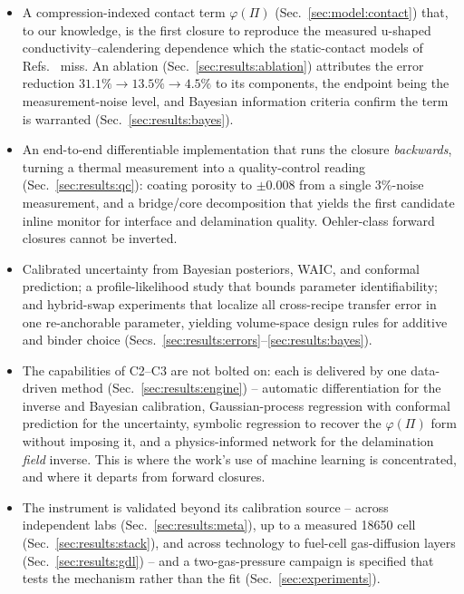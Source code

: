 \documentclass[10pt,a4paper]{article}
\begin{document}
\begin{itemize}
\item[\textbf{C1 -- process resolution.}] A compression-indexed contact term $\varphi(\Pi)$ (Sec.~\ref{sec:model:contact}) that, to our knowledge, is the first closure to reproduce the measured u-shaped conductivity--calendering dependence which the static-contact models of Refs.~\cite{oehler2021,sangros2017} miss. An ablation (Sec.~\ref{sec:results:ablation}) attributes the error reduction $31.1\%\to13.5\%\to4.5\%$ to its components, the endpoint being the measurement-noise level, and Bayesian information criteria confirm the term is warranted (Sec.~\ref{sec:results:bayes}).
\item[\textbf{C2 -- invertibility.}] An end-to-end differentiable implementation that runs the closure \emph{backwards}, turning a thermal measurement into a quality-control reading (Sec.~\ref{sec:results:qc}): coating porosity to $\pm0.008$ from a single $3\%$-noise measurement, and a bridge/core decomposition that yields the first candidate inline monitor for interface and delamination quality. Oehler-class forward closures cannot be inverted.
\item[\textbf{C3 -- uncertainty and transfer.}] Calibrated uncertainty from Bayesian posteriors, WAIC, and conformal prediction; a profile-likelihood study that bounds parameter identifiability; and hybrid-swap experiments that localize all cross-recipe transfer error in one re-anchorable parameter, yielding volume-space design rules for additive and binder choice (Secs.~\ref{sec:results:errors}--\ref{sec:results:bayes}).
\item[\textbf{C4 -- data-driven methods as the enabling engine.}] The capabilities of C2--C3 are not bolted on: each is delivered by one data-driven method (Sec.~\ref{sec:results:engine}) -- automatic differentiation for the inverse and Bayesian calibration, Gaussian-process regression with conformal prediction for the uncertainty, symbolic regression to recover the $\varphi(\Pi)$ form without imposing it, and a physics-informed network for the delamination \emph{field} inverse. This is where the work's use of machine learning is concentrated, and where it departs from forward closures.
\item[\textbf{C5 -- generalization and a falsifiable test.}] The instrument is validated beyond its calibration source -- across independent labs (Sec.~\ref{sec:results:meta}), up to a measured 18650 cell (Sec.~\ref{sec:results:stack}), and across technology to fuel-cell gas-diffusion layers (Sec.~\ref{sec:results:gdl}) -- and a two-gas-pressure campaign is specified that tests the mechanism rather than the fit (Sec.~\ref{sec:experiments}).
\end{itemize}
\end{document}
